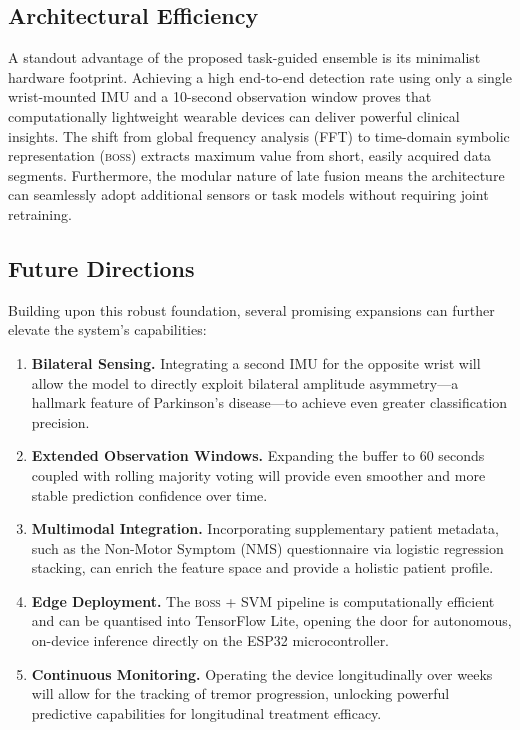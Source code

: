 \documentclass[12pt, a4paper]{article}
\newcommand{\boss}{\textsc{boss}}
\begin{document}
\subsection{Architectural Efficiency}

A standout advantage of the proposed task-guided ensemble is its minimalist hardware footprint. Achieving a high end-to-end detection rate using only a single wrist-mounted IMU and a 10-second observation window proves that computationally lightweight wearable devices can deliver powerful clinical insights. The shift from global frequency analysis (FFT) to time-domain symbolic representation (\boss{}) extracts maximum value from short, easily acquired data segments. Furthermore, the modular nature of late fusion means the architecture can seamlessly adopt additional sensors or task models without requiring joint retraining.

\subsection{Future Directions}

Building upon this robust foundation, several promising expansions can further elevate the system's capabilities:
\begin{enumerate}
  \item \textbf{Bilateral Sensing.} Integrating a second IMU for the opposite wrist will allow the model to directly exploit bilateral amplitude asymmetry—a hallmark feature of Parkinson's disease—to achieve even greater classification precision.
  \item \textbf{Extended Observation Windows.} Expanding the buffer to 60 seconds coupled with rolling majority voting will provide even smoother and more stable prediction confidence over time.
  \item \textbf{Multimodal Integration.} Incorporating supplementary patient metadata, such as the Non-Motor Symptom (NMS) questionnaire via logistic regression stacking, can enrich the feature space and provide a holistic patient profile.
  \item \textbf{Edge Deployment.} The \boss{} + SVM pipeline is computationally efficient and can be quantised into TensorFlow Lite, opening the door for autonomous, on-device inference directly on the ESP32 microcontroller.
  \item \textbf{Continuous Monitoring.} Operating the device longitudinally over weeks will allow for the tracking of tremor progression, unlocking powerful predictive capabilities for longitudinal treatment efficacy.
\end{enumerate}
\end{document}
